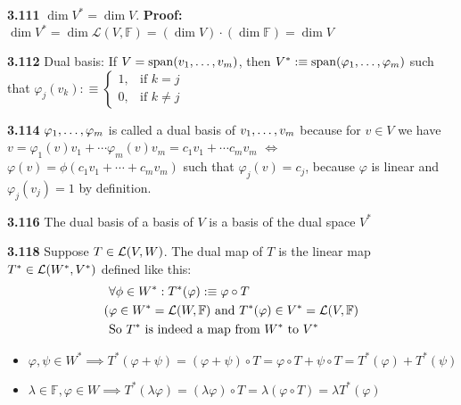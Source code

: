 \textbf{3.111} $\dim V^{*} = \dim V$. \textbf{Proof:} $\dim V^{*} = \dim \mathcal{L}(V, \mathbb{F})=(\dim V) \cdot (\dim \mathbb{F}) = \dim V $

\textbf{3.112} Dual basis: If $V=\operatorname{span} (v_1, \dots, v_m)$, then $V^{*} :\equiv 	
\operatorname{span} (\varphi_1, \dots, \varphi_m)$ such that
$\varphi_j(v_k) :\equiv
\begin{cases}
	1,  & \text{if $k=j$} \\
	0, & \text{if $k \neq j$}
\end{cases}$

\textbf{3.114} $\varphi_1, \dots, \varphi_m$ is called a dual basis of $v_1, \dots, v_m$ because for $v \in V$ we have $v=\varphi_1 (v)v_1 + \cdots \varphi_m(v)v_m = c_1v_1 + \cdots c_mv_m$ $\iff$ $\varphi(v)=\phi(c_1v_1 + \cdots + c_mv_m)$ such that $\varphi_j(v)=c_j$, because $\varphi$ is linear and $\varphi_j(v_j)=1$ by definition.

\textbf{3.116} The dual basis of a basis of $V$ is a basis of the dual space $V^{*}$

\textbf{3.118} Suppose $T \in {\mathcal{L}(V,W)}$. The dual map of $T$ is the linear map $T^{*} \in {\mathcal{L}(W^{*}, V^{*})}$ defined like this:
\begin{align}
	&\forall \phi \in W^{*}: T^{*}(\varphi) :\equiv \varphi \circ T \\
	(&\varphi \in W^{*}={\mathcal{L}(W, \mathbb{F})} \text{ and } T^{*}(\varphi) \in V^{*} = {\mathcal{L}(V, \mathbb{F})} \\
	&\text{So $T^{*}$ is indeed a map from $W^{*}$ to $V^{*}$} 
\end{align}

\begin{itemize}
	\item $\varphi, \psi \in W^{*} \implies T^{*} (\varphi + \psi) = (\varphi + \psi) \circ T = \varphi \circ T + \psi \circ T = T^{*} (\varphi) + T^{*} (\psi)$
	\item $\lambda \in \mathbb{F}, \varphi \in W \implies T^{*} (\lambda \varphi) = (\lambda \varphi) \circ T = \lambda (\varphi \circ T) = \lambda T^{*} (\varphi)$ 
\end{itemize}


